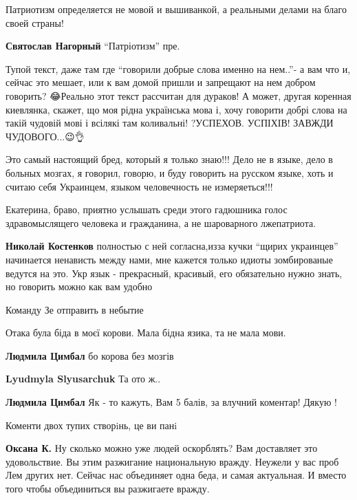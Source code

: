 \begin{itemize}
Патриотизм определяется не мовой и вышиванкой, а реальными делами на благо своей
страны!

\textbf{Святослав Нагорный} \enquote{Патріотизм} пре.


Тупой текст, даже там где \enquote{говорили добрые слова именно на нем..}- а вам что и,
сейчас это мешает, или к вам домой пришли и запрещают на нем добром говорить?
😂Реально этот текст рассчитан для дураков! А может, другая коренная киевлянка,
скажет, що моя рідна українська мова і, хочу говорити добрі слова на такій
чудовій мові і всілякі там коливальні! ?УСПЕХОВ. УСПІХІВ! ЗАВЖДИ
ЧУДОВОГО...😉👌💙💜💓



Это самый настоящий бред, который я только знаю!!! Дело не в языке, дело в больных
мозгах, я говорил, говорю, и буду говорить на русском языке, хоть и считаю себя
Украинцем, языком человечность не измеряеться!!!

Екатерина, браво, приятно услышать среди этого гадюшника голос здравомыслящего
человека и гражданина, а не шароварного лжепатриота.


\begin{itemize}
 \textbf{Николай Костенков} полностью с ней согласна,изза
кучки \enquote{щирих украинцев} начинается ненависть между нами, мне кажется только
идиоты зомбированые ведутся на это. Укр язык - прекрасный, красивый, его
обязательно нужно знать, но говорить можно как вам удобно
\end{itemize}

Команду Зе отправить в небытие

Отака була біда в моєї корови. Мала бідна язика, та не мала мови.

\begin{itemize}

\textbf{Людмила Цимбал} бо корова без мозгів

\textbf{Lyudmyla Slyusarchuk} Та ото ж..

\textbf{Людмила Цимбал} Як - то кажуть, Вам 5 балів, за влучний коментар! Дякую !

Коменти двох тупих створiнь, це ви панi

\textbf{Оксана К.} Ну сколько можно уже людей оскорблять? Вам доставляет это
удовольствие. Вы этим разжигание национальную вражду. Неужели у вас проб Лем
других нет. Сейчас нас объединяет одна беда, и самая актуальная. И вместо того
чтобы объединиться вы разжигаете вражду.


\end{itemize}
\end{itemize}
